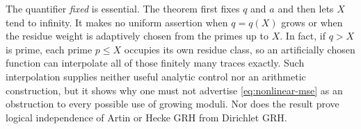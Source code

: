 The quantifier \emph{fixed} is essential. The theorem first fixes $q$ and
$a$ and then lets $X$ tend to infinity. It makes no uniform assertion
when $q=q(X)$ grows or when the residue weight is adaptively chosen from
the primes up to $X$. In fact, if $q>X$ is prime, each prime $p\le X$
occupies its own residue class, so an artificially chosen function can
interpolate all of those finitely many traces exactly. Such interpolation
supplies neither useful analytic control nor an arithmetic construction,
but it shows why one must not advertise \eqref{eq:nonlinear-mse} as an
obstruction to every possible use of growing moduli. Nor does the result
prove logical independence of Artin or Hecke GRH from Dirichlet GRH.

